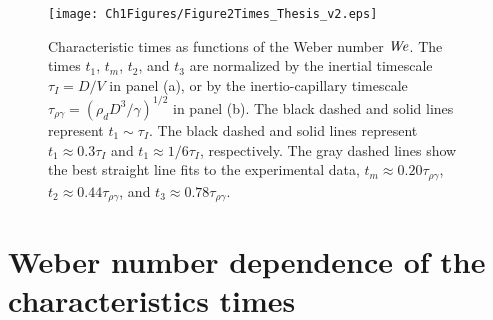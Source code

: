 \begin{figure}
	\centering
	\texttt{[image: Ch1Figures/Figure2Times\_Thesis\_v2.eps]}
	\caption{Characteristic times as functions of the Weber number $\mathit{We}$. The times $t_1$, $t_m$, $t_2$, and $t_3$ are normalized by the inertial timescale $\tau_I = D/V$ in panel (a), or by the inertio-capillary timescale $\tau_{\rho\gamma} = (\rho_d D^3/\gamma)^{1/2}$ in panel (b). The black dashed and solid lines represent $t_1 \sim \tau_I$. The black dashed and solid lines represent $t_1 \approx 0.3\tau_I$ and $t_1 \approx 1/6\tau_I$, respectively. The gray dashed lines show  the best straight line fits to the experimental data, $t_m \approx 0.20\tau_{\rho\gamma}$, $t_2 \approx 0.44\tau_{\rho\gamma}$, and $t_3 \approx 0.78\tau_{\rho\gamma}$.}
	\label{Ch2:Fig2Times}
\end{figure}

\section{Weber number dependence of the characteristics times}\label{Ch2:SecTimes}


